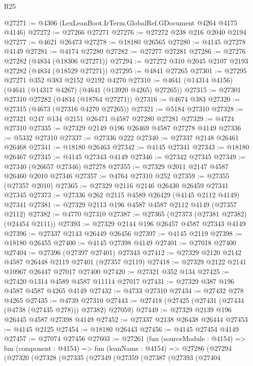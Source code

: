 \begin{lexlean}{R25}
\begin{coremodule}
@27271 := @4306 (LexLeanBoot.IrTerm.GlobalRef.GDocument @4264 @4175 @4146)
@27272 := @27266 @27271
@27276 := @27272 @238 @216 @2040 @2194
@27277 := @4621 @26473
@27278 := @18180 @26565
@27280 := @4145 @27278 @4149
@27281 := @4174 @27280
@27282 := @27277 @27281
@27286 := @27276 @27282 (@4834 (@18306 @27271))
@27294 := @27272 @310 @2045 @2107 @2193 @27282 (@4834 (@18529 @27271))
@27295 := @4841 @27265
@27301 := @27295 @27271 @352 @383 @2152 @2192 @4270
@27310 := @4641 (@14314 @4156) (@4641 (@14317 @4267) (@4641 (@13920 @4265) @27265))
@27315 := @27301 @27310 @27282 (@4834 (@18764 @27271))
@27316 := @4674 @383
@27320 := @27315 (@4673 (@27316 @4270 @27265))
@27321 := @5184 @27310
@27328 := @27321 @247 @134 @2151 @26471 @4587 @27280 @27281
@27329 := @4724 @27310
@27335 := @27329 @2149 @196 @26469 @4587 @27278 @4149
@27336 := @5332 @27310
@27337 := @27336 @222
@27340 := @27337 @2148 @26461 @26468
@27341 := @18180 @26463
@27342 := @4145 @27341
@27343 := @18180 @26467
@27345 := @4145 @27343 @4149
@27346 := @27342 @27345
@27349 := @27340 (@26657 @27346) @27278
@27355 := @27329 @2011 @2147 @4587 @26460 @2010 @27346
@27357 := @4764 @27310 @252
@27359 := @27355 (@27357 @2010)
@27365 := @27329 @2116 @2146 @26430 @26459 @27341 @27345
@27373 := @27336 @262 @2115 @4589 @26429 (@4145 @2112 @4149) @27341
@27381 := @27329 @2113 @196 @4587 @4587 @2112 @4149 (@27357 @2112)
@27382 := @4770 @27310
@27387 := @27365 (@27373 (@27381 @27382) (@24454 @2111))
@27393 := @27329 @2144 @196 @26457 @4587 @27343 @4149
@27396 := @27337 @2143 @26449 @26456
@27397 := @4145 @2119
@27398 := @18180 @26455
@27400 := @4145 @27398 @4149
@27401 := @27018 @27400
@27404 := @27396 (@27397 @27401) @27343
@27412 := @27329 @2120 @2142 @4587 @26448 @2119 @27401 (@27357 @2119)
@27418 := @27329 @2122 @2141 @10967 @26447 @27017 @27400
@27420 := @27321 @352 @134
@27425 := @27420 @1314 @4589 @4587 @11114 @27017
@27431 := @27329 @387 @196 @4587 @4587 @4265 @4149
@27432 := @4733 @27310
@27434 := @27432 @278 @4265
@27435 := @4739 @27310
@27443 := @27418 (@27425 (@27431 (@27434 (@4738 (@27435 @278))) @27382) @27059)
@27449 := @27329 @2139 @196 @26445 @4587 @27398 @4149
@27452 := @27337 @2138 @26438 @26444
@27453 := @4145 @2125
@27454 := @18180 @26443
@27456 := @4145 @27454 @4149
@27457 := @27074 @27456
@27603 := @27261
    (fun (sourceModule : @4154) =>
    fun (component : @4154) =>
    fun (leanName : @4154) =>
    @27286
      (@27294
        (@27320
          (@27328
            (@27335
              (@27349
                (@27359
                  (@27387
                    (@27393
                      (@27404

\end{coremodule}
\end{lexlean}
